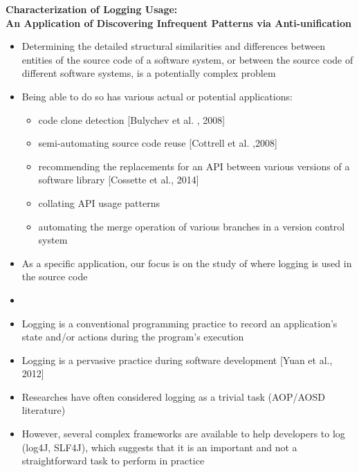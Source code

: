 \documentclass{article}
\begin{document}
\begin{titlepage}
   \begin{center}
      \Large\textbf{Characterization of Logging Usage:\\An Application of Discovering Infrequent Patterns via Anti-unification}
   \end{center}
\end{titlepage}

\begin{itemize} [leftmargin=.1in]
\item Determining the detailed structural similarities and differences between entities of the source code of a software system, or between the source code of different software systems, is a potentially complex problem
\item Being able to do so has various actual or potential applications:
\begin{itemize}
\item code clone detection [Bulychev et al. , 2008]
\item semi-automating source code reuse [Cottrell et al. ,2008]
\item recommending the replacements for an API between various versions of a software library [Cossette et al., 2014]
\item collating API usage patterns
\item automating the merge operation of various branches in a version control system
\end{itemize}
\item As a specific application, our focus is on the study of where logging is used in the source code
\item {} 
\item Logging is a conventional programming practice to record an application's state and/or actions during the program's execution
\item Logging is a pervasive practice during software development [Yuan et al., 2012]
\item Researches have often considered logging as a trivial task (AOP/AOSD literature) %
\item However, several complex frameworks are available to help developers to log (log4J, SLF4J), which suggests that it is  an important and not a straightforward task to perform in practice

\end{itemize}
\end{document}
